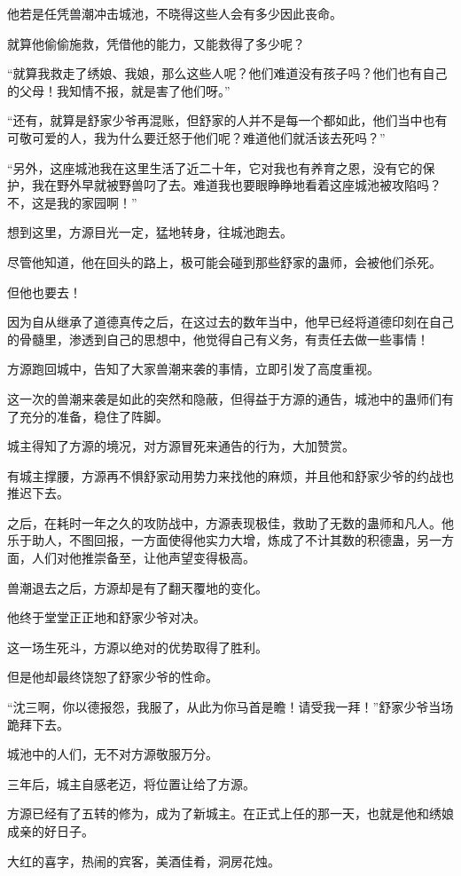 \begin{this_body}
他若是任凭兽潮冲击城池，不晓得这些人会有多少因此丧命。

就算他偷偷施救，凭借他的能力，又能救得了多少呢？

“就算我救走了绣娘、我娘，那么这些人呢？他们难道没有孩子吗？他们也有自己的父母！我知情不报，就是害了他们呀。”

“还有，就算是舒家少爷再混账，但舒家的人并不是每一个都如此，他们当中也有可敬可爱的人，我为什么要迁怒于他们呢？难道他们就活该去死吗？”

“另外，这座城池我在这里生活了近二十年，它对我也有养育之恩，没有它的保护，我在野外早就被野兽叼了去。难道我也要眼睁睁地看着这座城池被攻陷吗？不，这是我的家园啊！”

想到这里，方源目光一定，猛地转身，往城池跑去。

尽管他知道，他在回头的路上，极可能会碰到那些舒家的蛊师，会被他们杀死。

但他也要去！

因为自从继承了道德真传之后，在这过去的数年当中，他早已经将道德印刻在自己的骨髓里，渗透到自己的思想中，他觉得自己有义务，有责任去做一些事情！

方源跑回城中，告知了大家兽潮来袭的事情，立即引发了高度重视。

这一次的兽潮来袭是如此的突然和隐蔽，但得益于方源的通告，城池中的蛊师们有了充分的准备，稳住了阵脚。

城主得知了方源的境况，对方源冒死来通告的行为，大加赞赏。

有城主撑腰，方源再不惧舒家动用势力来找他的麻烦，并且他和舒家少爷的约战也推迟下去。

之后，在耗时一年之久的攻防战中，方源表现极佳，救助了无数的蛊师和凡人。他乐于助人，不图回报，一方面使得他实力大增，炼成了不计其数的积德蛊，另一方面，人们对他推崇备至，让他声望变得极高。

兽潮退去之后，方源却是有了翻天覆地的变化。

他终于堂堂正正地和舒家少爷对决。

这一场生死斗，方源以绝对的优势取得了胜利。

但是他却最终饶恕了舒家少爷的性命。

“沈三啊，你以德报怨，我服了，从此为你马首是瞻！请受我一拜！”舒家少爷当场跪拜下去。

城池中的人们，无不对方源敬服万分。

三年后，城主自感老迈，将位置让给了方源。

方源已经有了五转的修为，成为了新城主。在正式上任的那一天，也就是他和绣娘成亲的好日子。

大红的喜字，热闹的宾客，美酒佳肴，洞房花烛。


\end{this_body}
